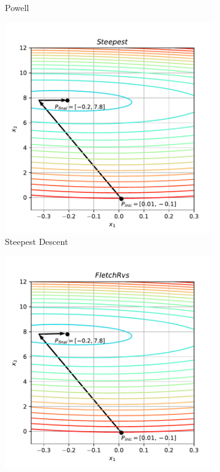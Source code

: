 \documentclass[10pt, a4paper]{article}
\begin{document}
\begin{figure}[htpb]
\begin{subfigure}[b]{0.32\textwidth}
    \caption{Powell}
    \label{fig:q2a_powell}
  \end{subfigure}
  \hfill
  \begin{subfigure}[b]{0.32\textwidth}
    \centering
    \includegraphics[width=\textwidth]{images/q2a_Steepest.pdf}
    \caption{Steepest Descent}
    \label{fig:q2a_steepest}
  \end{subfigure}
  \hfill
  \begin{subfigure}[b]{0.32\textwidth}
    \centering
    \includegraphics[width=\textwidth]{images/q2a_FletchRvs.pdf}

\end{subfigure}
\end{figure}
\end{document}
